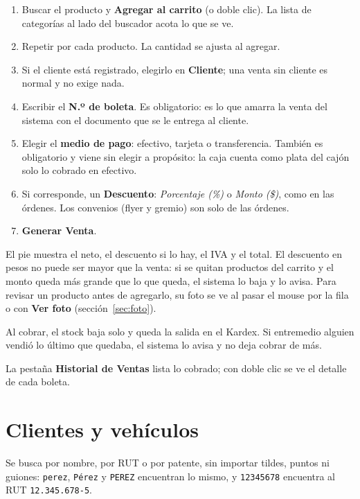 \documentclass[11pt,a4paper]{article}
\begin{document}
\begin{enumerate}
  \item Buscar el producto y \textbf{Agregar al carrito} (o doble clic). La
        lista de categorías al lado del buscador acota lo que se ve.
  \item Repetir por cada producto. La cantidad se ajusta al agregar.
  \item Si el cliente está registrado, elegirlo en \textbf{Cliente}; una venta
        sin cliente es normal y no exige nada.
  \item Escribir el \textbf{N.º de boleta}. Es obligatorio: es lo que amarra la
        venta del sistema con el documento que se le entrega al cliente.
  \item Elegir el \textbf{medio de pago}: efectivo, tarjeta o transferencia.
        También es obligatorio y viene sin elegir a propósito: la caja cuenta
        como plata del cajón solo lo cobrado en efectivo.
  \item Si corresponde, un \textbf{Descuento}: \emph{Porcentaje (\%)} o
        \emph{Monto (\$)}, como en las órdenes. Los convenios (flyer y gremio)
        son solo de las órdenes.
  \item \textbf{Generar Venta}.
\end{enumerate}

El pie muestra el neto, el descuento si lo hay, el IVA y el total. El
descuento en pesos no puede ser mayor que la venta: si se quitan productos del
carrito y el monto queda más grande que lo que queda, el sistema lo baja y lo
avisa. Para revisar un producto antes de agregarlo, su foto se ve al pasar el
mouse por la fila o con \textbf{Ver foto} (sección~\ref{sec:foto}).

Al cobrar, el stock baja solo y queda
la salida en el Kardex. Si entremedio alguien vendió lo último que quedaba, el
sistema lo avisa y no deja cobrar de más.

La pestaña \textbf{Historial de Ventas} lista lo cobrado; con doble clic se ve el
detalle de cada boleta.

\section{Clientes y vehículos}


Se busca por nombre, por RUT o por patente, sin importar tildes, puntos ni
guiones: \texttt{perez}, \texttt{Pérez} y \texttt{PEREZ} encuentran lo mismo, y
\texttt{12345678} encuentra al RUT \texttt{12.345.678-5}.
\end{document}
